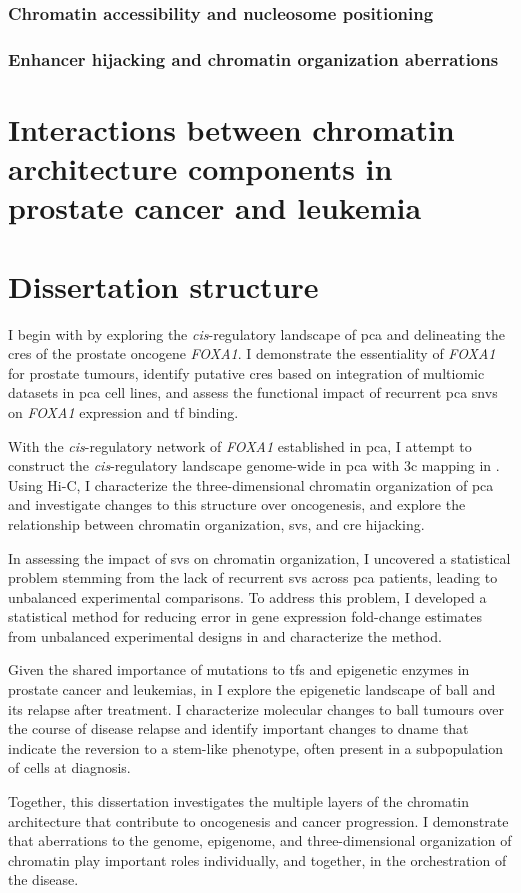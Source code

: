 \subsubsection{Chromatin accessibility and nucleosome positioning}

\subsubsection{Enhancer hijacking and chromatin organization aberrations}

\section{Interactions between chromatin architecture components in prostate cancer and leukemia}

\section{Dissertation structure}

I begin with  by exploring the \emph{cis}-regulatory landscape of \gls{pca} and delineating the \glspl{cre} of the prostate oncogene \emph{FOXA1}.
I demonstrate the essentiality of \emph{FOXA1} for prostate tumours, identify putative \glspl{cre} based on integration of multiomic datasets in \gls{pca} cell lines, and assess the functional impact of recurrent \gls{pca} \glspl{snv} on \emph{FOXA1} expression and \gls{tf} binding.

With the \emph{cis}-regulatory network of \emph{FOXA1} established in \gls{pca}, I attempt to construct the \emph{cis}-regulatory landscape genome-wide in \gls{pca} with \gls{3c} mapping in .
Using Hi-C, I characterize the three-dimensional chromatin organization of \gls{pca} and investigate changes to this structure over oncogenesis, and explore the relationship between chromatin organization, \glspl{sv}, and \gls{cre} hijacking.

In assessing the impact of \glspl{sv} on chromatin organization, I uncovered a statistical problem stemming from the lack of recurrent \glspl{sv} across \gls{pca} patients, leading to unbalanced experimental comparisons.
To address this problem, I developed a statistical method for reducing error in gene expression fold-change estimates from unbalanced experimental designs in  and characterize the method.

Given the shared importance of mutations to \glspl{tf} and epigenetic enzymes in prostate cancer and leukemias, in  I explore the epigenetic landscape of \gls{ball} and its relapse after treatment.
I characterize molecular changes to \gls{ball} tumours over the course of disease relapse and identify important changes to \gls{dname} that indicate the reversion to a stem-like phenotype, often present in a subpopulation of cells at diagnosis.

Together, this dissertation investigates the multiple layers of the chromatin architecture that contribute to oncogenesis and cancer progression.
I demonstrate that aberrations to the genome, epigenome, and three-dimensional organization of chromatin play important roles individually, and together, in the orchestration of the disease.

